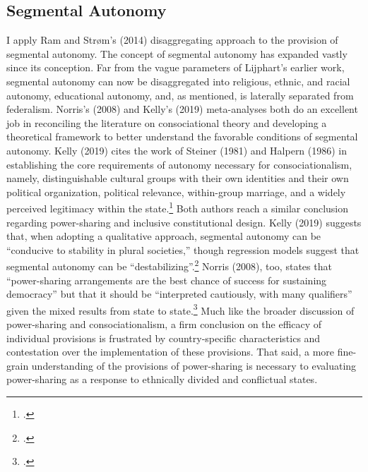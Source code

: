 \documentclass[12pt]{article}
\begin{document}
\subsection{Segmental Autonomy}
I apply Ram and Strøm's (2014) disaggregating approach to the provision of segmental autonomy. The concept of segmental autonomy has expanded vastly since its conception. Far from the vague parameters of Lijphart’s earlier work, segmental autonomy can now be disaggregated into religious, ethnic, and racial autonomy, educational autonomy, and, as mentioned, is laterally separated from federalism. Norris’s (2008) and Kelly’s (2019) meta-analyses both do an excellent job in reconciling the literature on consociational theory and developing a theoretical framework to better understand the favorable conditions of segmental autonomy. Kelly (2019) cites the work of Steiner (1981) and Halpern (1986) in establishing the core requirements of autonomy necessary for consociationalism, namely, distinguishable cultural groups with their own identities and their own political organization, political relevance, within-group marriage, and a widely perceived legitimacy within the state.\footcite[30]{kelly_power-sharing_2019} Both authors reach a similar conclusion regarding power-sharing and inclusive constitutional design. Kelly (2019) suggests that, when adopting a qualitative approach, segmental autonomy can be ``conducive to stability in plural societies,'' though regression models suggest that segmental autonomy can be ``destabilizing''.\footcite[3]{kelly_power-sharing_2019} Norris (2008), too, states that ``power-sharing arrangements are the best chance of success for sustaining democracy'' but that it should be ``interpreted cautiously, with many qualifiers'' given the mixed results from state to state.\footcite[222]{norris_what_2008} Much like the broader discussion of power-sharing and consociationalism, a firm conclusion on the efficacy of individual provisions is frustrated by country-specific characteristics and contestation over the implementation of these provisions. That said, a more fine-grain understanding of the provisions of power-sharing is necessary to evaluating power-sharing as a response to ethnically divided and conflictual states.
\end{document}
